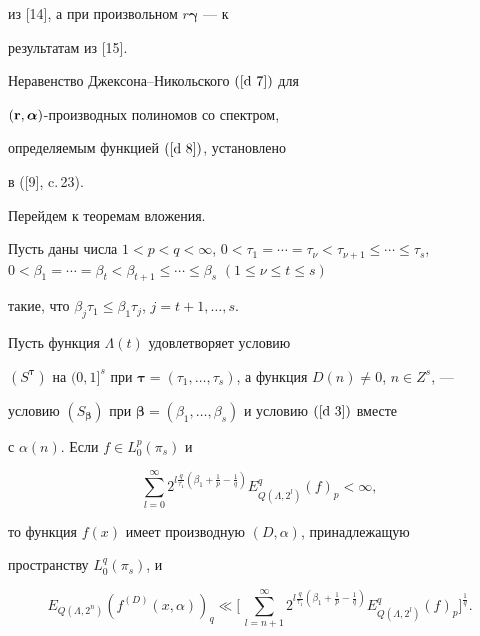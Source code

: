 из [14], а при произвольном $r{\boldsymbol{\gamma}}$ --- к 


результатам из [15].





Неравенство Джексона--Никольского $(\ref {d 7})$ для 


$({\bold r},{\boldsymbol{\alpha}})$-производных полиномов со спектром,


определяемым функцией $(\ref {d 8})$, установлено 


в ([9], c.\,23).





Перейдем к теоремам вложения.





\begin{thm} 


Пусть даны числа $1<p< q<\infty$, $0<\tau_1=\dotsb=\tau_{\nu}<


\tau_{\nu+1}\leq\dotsb\leq{\tau_s}$, $0<\beta_1=\dotsb=\beta_t


<\beta_{t+1}\leq\dotsb\leq\beta_s$ $(1 \leq \nu\leq t \leq s)$ 


такие, что $\beta_j \tau_1\leq \beta_1 \tau_j$, $j=t+1,\dotsc,s$.


Пусть функция $\Lambda(t)$ удовлетворяет условию 


$(S^{\boldsymbol{\tau}})$ на $(0,1]^s$ при ${\boldsymbol{\tau}}


=(\tau_1,\dotsc,\tau_s)$, а функция $D(n)\neq 0$, $n\in Z^s$, --- 


условию $(S_{\boldsymbol{\beta}})$ при ${\boldsymbol{\beta}}


=(\beta_1,\dotsc,\beta_s)$ и условию $(\ref {d 3})$ вместе


с $\alpha(n)$. Если $f\in L_0^p(\pi_s)$ и


\begin{equation} \label{d 9}


\sum_{l=0}^\infty 


2^{l{\frac{q}{\tau_1}}(\beta_1+{\frac{1}{p}}-{\frac{1}{q}}


)} E_{Q(\Lambda,2^l)}^q(f)_p<\infty,


\end{equation}


то функция $f(x)$ имеет производную $(D,\alpha)$, принадлежащую 


пространству $L_0^q(\pi_s)$, и 


$$


E_{Q(\Lambda,2^n)}(f^{(D)}(x, \alpha))_q \ll


\bigg[\, \sum_{l=n+1}^\infty 2^{l{\frac{q}{\tau_1}}(


\beta_1+{\frac{1}{p}}-{\frac{1}{q}})}


E_{Q(\Lambda,2^l)}^q(f)_p \bigg]^{\frac{1}{q}}.


$$


\end{thm}





